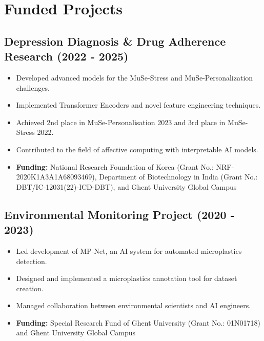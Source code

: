 \documentclass[11pt]{article}
\begin{document}
\section{Funded Projects}
\subsection{Depression Diagnosis \& Drug Adherence Research (2022 - 2025)}
\begin{itemize}
    \item[\checkmark] Developed advanced models for the MuSe-Stress and MuSe-Personalization challenges.
    \item[\checkmark] Implemented Transformer Encoders and novel feature engineering techniques.
    \item[\checkmark] Achieved 2nd place in MuSe-Personalisation 2023 and 3rd place in MuSe-Stress 2022.
    \item[\checkmark] Contributed to the field of affective computing with interpretable AI models.
    \item[\checkmark] \textbf{Funding:} National Research Foundation of Korea (Grant No.: NRF-2020K1A3A1A68093469), Department of Biotechnology in India (Grant No.: DBT/IC-12031(22)-ICD-DBT), and Ghent University Global Campus
\end{itemize}

\subsection{Environmental Monitoring Project (2020 - 2023)}
\begin{itemize}
    \item[\checkmark] Led development of MP-Net, an AI system for automated microplastics detection.
    \item[\checkmark] Designed and implemented a microplastics annotation tool for dataset creation.
    \item[\checkmark] Managed collaboration between environmental scientists and AI engineers.
    \item[\checkmark] \textbf{Funding:} Special Research Fund of Ghent University (Grant No.: 01N01718) and Ghent University Global Campus
\end{itemize}
\end{document}
